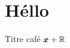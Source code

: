 \documentclass{article}
\begin{document}
\section{Héllo}
{\headingfont Titre} café $\bm{x} + \mathbb{R}$ 
\end{document}

